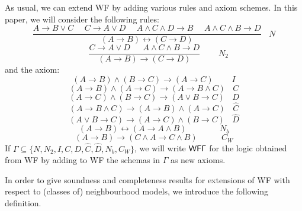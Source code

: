 \documentclass[12pt]{article}
\begin{document}
As usual, we can extend {\sf WF} by adding various rules and axiom schemes.
In this paper, we will consider the following rules:
$$ \frac{A\rightarrow B\vee C~~~~~~C\rightarrow A\vee D~~~~~~A\wedge C\wedge  D\rightarrow B~~~~~~ A\wedge C\wedge B\rightarrow D}{(A\rightarrow B)\leftrightarrow (C\rightarrow D)}~~~~ N$$
$$~~~~~ \frac{C\rightarrow A\vee D~~~~~~~ A\wedge C\wedge B\rightarrow D}{(A\rightarrow B)\rightarrow (C\rightarrow D)}~~~~~~~~~~ N_{2}$$
and the axiom:
$$(A\rightarrow B)\wedge (B\rightarrow C)\rightarrow(A\rightarrow  C)~~~~~~~~~~I$$
$$(A\rightarrow B)\wedge (A\rightarrow C)\rightarrow(A\rightarrow B\wedge C)  ~~~~C$$
$$(A\rightarrow C)\wedge (B\rightarrow C)\rightarrow(A\vee B \rightarrow C)  ~~~~D$$
$$(A\rightarrow B\wedge C)\rightarrow (A\rightarrow B)\wedge (A\rightarrow C) ~~~~\widehat{C} $$
$$ (A\vee B \rightarrow C)\rightarrow (A\rightarrow C)\wedge (B\rightarrow C) ~~~~\widehat{D}$$
$$(A\rightarrow B)\leftrightarrow (A \rightarrow A \wedge B)~~~~~~~~~~~~~~~~~~N_{b} $$
$$ (A \rightarrow  B)\rightarrow (C\wedge A\rightarrow C\wedge B)~~~~~~~~~~~~~C_{W}$$
If $ \Gamma\subseteq\lbrace N, N_{2},   I,  C, D, \widehat{C} , \widehat{D}, N_{b}, C_{W}\rbrace $, we will write ${\sf WF\Gamma }$ for the logic obtained from {\sf WF} by adding to  {\sf WF}  the schemas in $ \Gamma $ as new axioms.

In order to give soundness and completeness results for extensions of {\sf WF} with respect to (classes of) neighbourhood models, we introduce the following definition.
\end{document}
